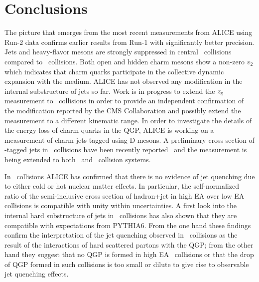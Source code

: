 \documentclass[10pt]{article}
\begin{document}

\section{Conclusions}
The picture that emerges from the most recent measurements from ALICE using Run-2 data confirms earlier results from Run-1 with significantly better precision.
Jets and heavy-flavor mesons are strongly suppressed in central \PbPb\ collisions compared to \pp\ collisions. Both open and hidden charm mesons show a non-zero $v_2$ which indicates 
that charm quarks participate in the collective dynamic expansion with the medium.
ALICE has not observed any modification in the internal substructure of jets so far. Work is in progress to extend the $z_{\rm g}$ measurement to \PbPb\ collisions
in order to provide an independent confirmation of the modification reported by the CMS Collaboration and possibly extend the measurement to a different kinematic range.
In order to investigate the details of the energy loss of charm quarks in the QGP, ALICE is working on a measurement of charm jets tagged using D mesons.
A preliminary cross section of \Dzero-tagged jets in \pp\ collisions have been recently reported~\cite{Aiola:2017} and the measurement is being extended to both \pPb\ and \PbPb\ collision systems.

In \pPb\ collisions ALICE has confirmed that there is no evidence of jet quenching due to either cold or hot nuclear matter effects.
In particular, the self-normalized ratio of the semi-inclusive cross section of hadron+jet in high EA over low EA collisions is compatible with unity within uncertainties.
A first look into the internal hard substructure of jets in \pPb\ collisions has also shown that they are compatible with expectations from PYTHIA6.
From the one hand these findings confirm the interpretation of the jet quenching observed in \PbPb\ collisions as the result of the interactions of hard scattered partons
with the QGP; from the other hand they suggest that no QGP is formed in high EA \pPb\ collisions or that the drop of QGP formed in such collisions is too small or dilute to give rise to observable jet quenching effects.
 
\end{document}
